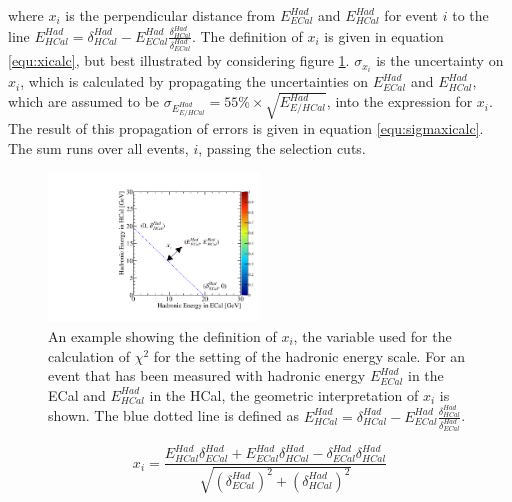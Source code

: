 where $x_{i}$ is the perpendicular distance from $E^{Had}_{ECal}$ and $E^{Had}_{HCal}$ for event $i$ to the line $E^{Had}_{HCal} = \delta^{Had}_{HCal} - E^{Had}_{ECal} \frac{\delta^{Had}_{HCal}}{\delta^{Had}_{ECal}}$.   The definition of $x_{i}$ is given in equation \ref{equ:xicalc}, but best illustrated by considering figure \ref{fig:hadscalechi2calc}.  $\sigma_{x_{i}}$ is the uncertainty on $x_{i}$, which is calculated by propagating the uncertainties on $E^{Had}_{ECal}$ and $E^{Had}_{HCal}$, which are assumed to be $\sigma_{E^{Had}_{E/HCal}} = 55\% \times \sqrt{E^{Had}_{E/HCal}}$, into the expression for $x_{i}$.  The result of this propagation of errors is given in equation \ref{equ:sigmaxicalc}.  The sum runs over all events, $i$, passing the selection cuts.  

\begin{figure}
\includegraphics[width=0.5\textwidth]{EnergyEstimators/Plots/Calibration/HadScaleSetting/HadScaleECalHCalSelectionExample.pdf}
\caption[An example showing the definition of $x_{i}$, the variable used for the calculation of $\chi^{2}(\delta^{Had}_{ECal}, \delta^{Had}_{HCal})$ for the setting of the hadronic energy scale.]{An example showing the definition of $x_{i}$, the variable used for the calculation of $\chi^{2}$ for the setting of the hadronic energy scale.  For an event that has been measured with hadronic energy $E^{Had}_{ECal}$ in the ECal and $E^{Had}_{HCal}$ in the HCal, the geometric interpretation of $x_{i}$ is shown.  The blue dotted line is defined as $E^{Had}_{HCal} = \delta^{Had}_{HCal} - E^{Had}_{ECal} \frac{\delta^{Had}_{HCal}}{\delta^{Had}_{ECal}}$.}
\label{fig:hadscalechi2calc}
\end{figure}

\begin{equation}
x_{i} = \frac{E^{Had}_{HCal} \delta^{Had}_{ECal} + E^{Had}_{ECal} \delta^{Had}_{HCal} - \delta^{Had}_{ECal} \delta^{Had}_{HCal}}{\sqrt{(\delta^{Had}_{ECal})^{2} + (\delta^{Had}_{HCal})^{2}}}
\label{equ:xicalc}
\end{equation}

